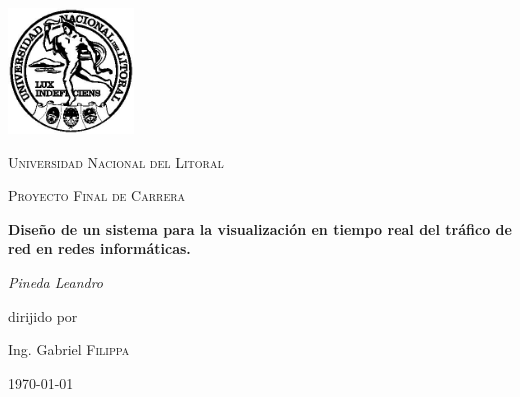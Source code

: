 \documentclass[a4paper,10pt, oneside]{book}
\begin{document}
\begin{titlepage}
	\centering
	\includegraphics[width=0.25\textwidth]{Universidad_del_Litoral}\par\vspace{1cm}
	{\scshape\LARGE Universidad Nacional del Litoral \par}
	\vspace{1cm}
	{\scshape\Large Proyecto Final de Carrera\par}
	\vspace{1.5cm}
	{\huge\bfseries Diseño de un sistema para la visualización en tiempo real del tráfico de red en redes informáticas.\par}
	\vspace{2cm}
	{\Large\itshape Pineda Leandro\par}
	\vfill
	dirijido por\par
	Ing. Gabriel \textsc{Filippa}

	\vfill
	
	{\large \today\par}

\end{titlepage}




\newpage

\nocite{*}
\printbibliography
\end{document}
